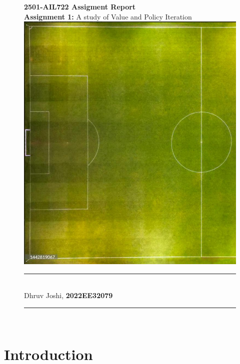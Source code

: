 \documentclass[10pt,a4paper]{article}
\begin{document}
\vfill
\begin{figure}[h!]
\begin{center}
    \vspace{4em}
    \huge \textbf{2501-AIL722 Assigment Report} \\[0.5em]

    \huge \textbf{Assignment 1:} A study of Value and Policy Iteration\\[4em]
    \includegraphics[width=0.5\linewidth]{../Q1/assets/background.jpg}
\end{center}
\end{figure}
\vfill
\begin{figure}[!b]
\begin{center}

    \rule{0.8\linewidth}{0.4pt} \\[2em]

    \Large Dhruv Joshi, \textbf{2022EE32079} \\[0.8em]

    \rule{0.8\linewidth}{0.4pt} \\[2em]

    
\end{center}
\end{figure}

\clearpage

\vfill

\tableofcontents
\clearpage 

\section{Introduction}
\end{document}
